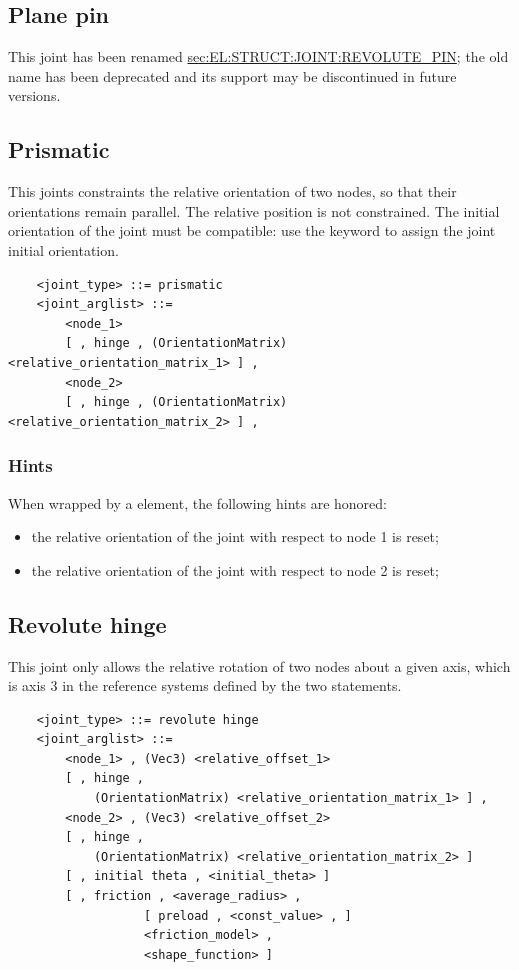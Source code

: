 \subsection{Plane pin}
This joint has been renamed
\hyperref{\kw{revolute pin}}{\kw{revolute pin} (see Section~}{)}{sec:EL:STRUCT:JOINT:REVOLUTE_PIN};
the old name has been deprecated and its support may be discontinued
in future versions.

\subsection{Prismatic}
This joints constraints the relative orientation of two nodes, so that
their orientations remain parallel.
The relative position is not constrained.
The initial orientation of the joint must be
compatible: use the  keyword to assign 
the joint initial orientation.
\begin{verbatim}
    <joint_type> ::= prismatic
    <joint_arglist> ::= 
        <node_1>
        [ , hinge , (OrientationMatrix) <relative_orientation_matrix_1> ] ,
        <node_2> 
        [ , hinge , (OrientationMatrix) <relative_orientation_matrix_2> ] ,    
\end{verbatim}

\subsubsection{Hints}
When wrapped by a  element, the following hints are honored:
\begin{itemize}
\item {} the relative orientation of the joint
with respect to node 1 is reset;
\item {} the relative orientation of the joint
with respect to node 2 is reset;
\end{itemize}

\subsection{Revolute hinge}
\label{sec:EL:STRUCT:JOINT:REVOLUTE_HINGE}
This joint only allows the relative rotation of two nodes about
a given axis, which is axis 3 in the reference systems defined 
by the two  statements.
\begin{verbatim}
    <joint_type> ::= revolute hinge
    <joint_arglist> ::= 
        <node_1> , (Vec3) <relative_offset_1> 
        [ , hinge , 
            (OrientationMatrix) <relative_orientation_matrix_1> ] ,
        <node_2> , (Vec3) <relative_offset_2>
        [ , hinge , 
            (OrientationMatrix) <relative_orientation_matrix_2> ]
        [ , initial theta , <initial_theta> ]
        [ , friction , <average_radius> , 
                   [ preload , <const_value> , ]
                   <friction_model> , 
                   <shape_function> ]
\end{verbatim}

